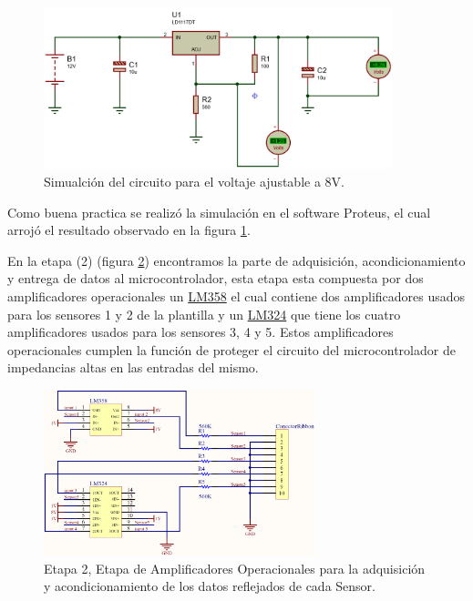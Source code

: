 \begin{figure}[H]
\centering
\includegraphics[width=0.9\textwidth]{./image/Simulacion_LD1117.png}
\caption{Simualción del circuito para el voltaje ajustable a 8V.}
\label{fig:SimulacionLD1117}
\end{figure}

Como buena practica se realizó la simulación en el software Proteus, el cual arrojó el resultado observado en la figura \ref{fig:SimulacionLD1117}.

En la etapa (2) (figura \ref{fig:EtapaAdquisicion}) encontramos la parte de adquisición, acondicionamiento y entrega de datos al microcontrolador, esta etapa esta compuesta por dos amplificadores operacionales un \href{http://www.ti.com/lit/ds/symlink/lm158-n.pdf}{LM358} el cual contiene dos amplificadores usados para los sensores 1 y 2 de la plantilla y un \href{http://www.ti.com/lit/ds/symlink/lm124-n.pdf}{LM324} que tiene los cuatro amplificadores usados para los sensores 3, 4 y 5. Estos amplificadores operacionales cumplen la función de proteger el circuito del microcontrolador de impedancias altas en las entradas del mismo.

\begin{figure}[H]
\centering
\includegraphics[width=0.7\textwidth]{./image/EtapaAdquisicionDatos.png}
\caption{Etapa 2, Etapa de Amplificadores Operacionales para la adquisición y acondicionamiento de los datos reflejados de cada Sensor.}
\label{fig:EtapaAdquisicion}
\end{figure}

